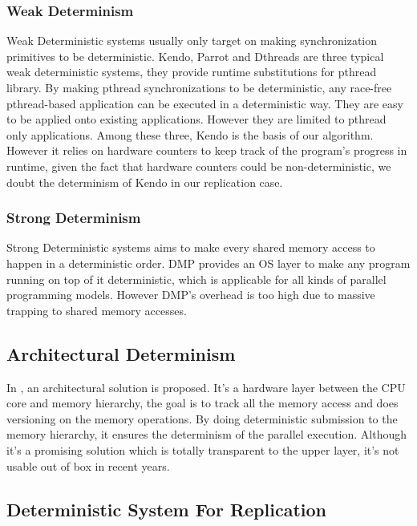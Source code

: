 \subsubsection{Weak Determinism}
Weak Deterministic systems usually only target on making synchronization primitives to be deterministic. Kendo\cite{olszewski2009kendo}, Parrot\cite{cui2013parrot} and Dthreads\cite{liu2011dthreads} are three typical weak deterministic systems, they provide runtime substitutions for pthread library. By making pthread synchronizations to be deterministic, any race-free pthread-based application can be executed in a deterministic way. They are easy to be applied onto existing applications. However they are limited to pthread only applications. Among these three, Kendo is the basis of our algorithm. However it relies on hardware counters to keep track of the program's progress in runtime, given the fact that hardware counters could be non-deterministic\cite{weaver2008can}, we doubt the determinism  of Kendo in our replication case. 

\subsubsection{Strong Determinism}
Strong Deterministic systems aims to make every shared memory access to happen in a deterministic order. DMP\cite{devietti2009dmp} provides an OS layer to make any program running on top of it deterministic, which is applicable for all kinds of parallel programming models. However DMP's overhead is too high due to massive trapping to shared memory accesses.

\subsection{Architectural Determinism}
In \cite{segulja2012architectural}, an architectural solution is proposed. It's a hardware layer between the CPU core and memory hierarchy, the goal is to track all the memory access and does versioning on the memory operations. By doing deterministic submission to the memory hierarchy, it ensures the determinism of the parallel execution. Although it's a promising solution which is totally transparent to the upper layer, it's not usable out of box in recent years. 

\subsection{Deterministic System For Replication}
